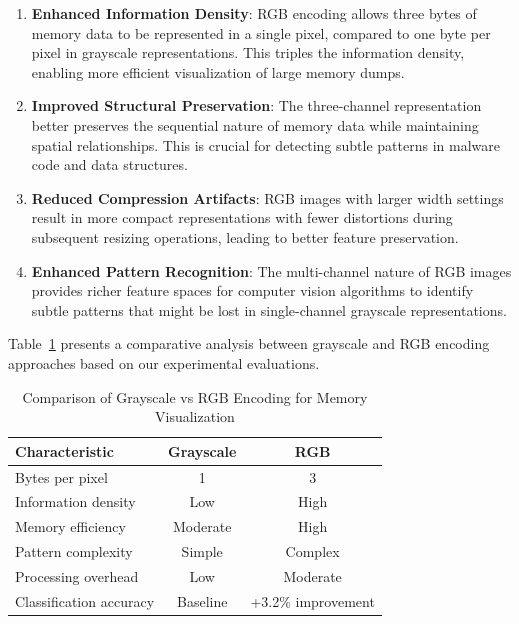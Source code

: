 \begin{enumerate}
    \item \textbf{Enhanced Information Density}: RGB encoding allows three bytes of memory data to be represented in a single pixel, compared to one byte per pixel in grayscale representations. This triples the information density, enabling more efficient visualization of large memory dumps.
    
    \item \textbf{Improved Structural Preservation}: The three-channel representation better preserves the sequential nature of memory data while maintaining spatial relationships. This is crucial for detecting subtle patterns in malware code and data structures.
    
    \item \textbf{Reduced Compression Artifacts}: RGB images with larger width settings result in more compact representations with fewer distortions during subsequent resizing operations, leading to better feature preservation.
    
    \item \textbf{Enhanced Pattern Recognition}: The multi-channel nature of RGB images provides richer feature spaces for computer vision algorithms to identify subtle patterns that might be lost in single-channel grayscale representations.
\end{enumerate}

Table~\ref{tab:encoding-comparison} presents a comparative analysis between grayscale and RGB encoding approaches based on our experimental evaluations.

\begin{table}[!htbp]
    \centering
    \caption{Comparison of Grayscale vs RGB Encoding for Memory Visualization}
    \label{tab:encoding-comparison}
    \begin{tabular}{|l|c|c|}
    \hline
    \textbf{Characteristic} & \textbf{Grayscale} & \textbf{RGB} \\
    \hline
    Bytes per pixel & 1 & 3 \\
    Information density & Low & High \\
    Memory efficiency & Moderate & High \\
    Pattern complexity & Simple & Complex \\
    Processing overhead & Low & Moderate \\
    Classification accuracy & Baseline & +3.2\% improvement \\
    \hline
    \end{tabular}
\end{table}

